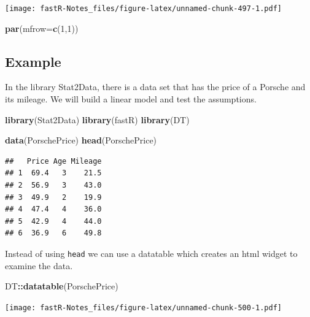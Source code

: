 \documentclass[]{book}
\newenvironment{Shaded}{\begin{snugshade}}{\end{snugshade}}
\newcommand{\KeywordTok}[1]{\textcolor[rgb]{0.13,0.29,0.53}{\textbf{#1}}}
\newcommand{\DataTypeTok}[1]{\textcolor[rgb]{0.13,0.29,0.53}{#1}}
\newcommand{\DecValTok}[1]{\textcolor[rgb]{0.00,0.00,0.81}{#1}}
\newcommand{\OperatorTok}[1]{\textcolor[rgb]{0.81,0.36,0.00}{\textbf{#1}}}
\newcommand{\NormalTok}[1]{#1}
\theoremstyle{definition}
\theoremstyle{definition}
\theoremstyle{definition}
\theoremstyle{remark}
\begin{document}
\texttt{[image: fastR-Notes\_files/figure-latex/unnamed-chunk-497-1.pdf]}

\begin{Shaded}
\begin{Highlighting}[]
\KeywordTok{par}\NormalTok{(}\DataTypeTok{mfrow=}\KeywordTok{c}\NormalTok{(}\DecValTok{1}\NormalTok{,}\DecValTok{1}\NormalTok{))}
\end{Highlighting}
\end{Shaded}

\subsection{Example}\label{example-5}

In the library Stat2Data, there is a data set that has the price of a
Porsche and its mileage. We will build a linear model and test the
assumptions.

\begin{Shaded}
\begin{Highlighting}[]
\KeywordTok{library}\NormalTok{(Stat2Data)}
\KeywordTok{library}\NormalTok{(fastR)}
\KeywordTok{library}\NormalTok{(DT)}
\end{Highlighting}
\end{Shaded}

\begin{Shaded}
\begin{Highlighting}[]
\KeywordTok{data}\NormalTok{(PorschePrice)}
\KeywordTok{head}\NormalTok{(PorschePrice)}
\end{Highlighting}
\end{Shaded}

\begin{verbatim}
##   Price Age Mileage
## 1  69.4   3    21.5
## 2  56.9   3    43.0
## 3  49.9   2    19.9
## 4  47.4   4    36.0
## 5  42.9   4    44.0
## 6  36.9   6    49.8
\end{verbatim}

Instead of using \texttt{head} we can use a datatable which creates an
html widget to examine the data.

\begin{Shaded}
\begin{Highlighting}[]
\NormalTok{DT}\OperatorTok{::}\KeywordTok{datatable}\NormalTok{(PorschePrice)}
\end{Highlighting}
\end{Shaded}

\texttt{[image: fastR-Notes\_files/figure-latex/unnamed-chunk-500-1.pdf]}
\end{document}
